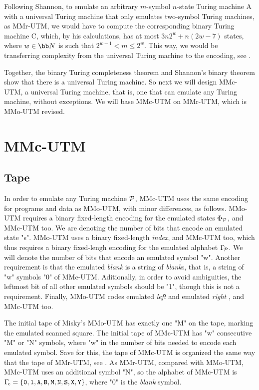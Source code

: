 Following Shannon, to emulate an arbitrary
$m$-symbol $n$-state Turing machine A
with a universal Turing machine that only emulates
two-symbol Turing machines, as MMr-UTM,
we would have to compute the corresponding
binary Turing machine C, which, by his calculations,
has at most $3n2^w+n(2w-7)$ states,
where $w\in{\bb N}$ is such that $2^{w-1} < m \le 2^w$.
This way, we would be transferring complexity
from the universal Turing machine to the encoding,
see .

Together, the binary Turing completeness theorem and
Shannon's binary theorem
show that there is a universal Turing machine.
So next we will design MMc-UTM, a universal Turing machine,
that is, one that can emulate any Turing machine,
without exceptions. We will base MMc-UTM on  MMr-UTM,
which is MMo-UTM revised.


\vfil\break

\section{MMc-UTM}

\subsection{Tape}

In order to emulate any Turing machine $\cal P$,
MMc-UTM uses the same encoding for programs and data as MMo-UTM,
with minor differences, as follows.
MMo-UTM requires a binary fixed-length encoding
for the emulated states $\Phi_{\cal P}$, and MMc-UTM too.
We are denoting the number of bits that encode an emulated state "s".
MMo-UTM uses a binary fixed-length {\em index}, and MMc-UTM too,
which thus requires a binary fixed-lengh encoding
for the emulated alphabet $\Gamma_{\!\cal P}$.
We will denote the number of bits that encode an emulated symbol "w".
Another requirement is that
 the emulated {\em blank} is a string of {\em blank}s,
that is, a string of "w" symbols "0" of MMc-UTM.
Aditionally, in order to avoid ambiguities,
the leftmost bit of all other emulated symbols should be "1",
though this is not a requirement.
Finally, MMo-UTM codes emulated {\em left} 
and emulated {\em right} , and MMc-UTM too.

The initial tape of Misky's MMo-UTM has exactly one "M" on the tape,
marking the emulated scanned square.
The initial tape of MMc-UTM has "w" consecutive "M" or "N" symbols,
where "w" in the number of bits needed to encode each emulated symbol.
Save for this, the tape of MMc-UTM is organized the same way that
the tape of MMr-UTM, see .
As MMr-UTM, compared with MMo-UTM,
MMc-UTM uses an additional symbol "N",
so the alphabet of MMc-UTM is
 $\Gamma_{\!\rm c} = \{ \hbox{\tt0}, \hbox{\tt1}, \hbox{\tt A}, \hbox{\tt B}, \hbox{\tt M}, \hbox{\tt N},
 \hbox{\tt S}, \hbox{\tt X}, \hbox{\tt Y} \}$, where "0" is the {\em blank} symbol.

